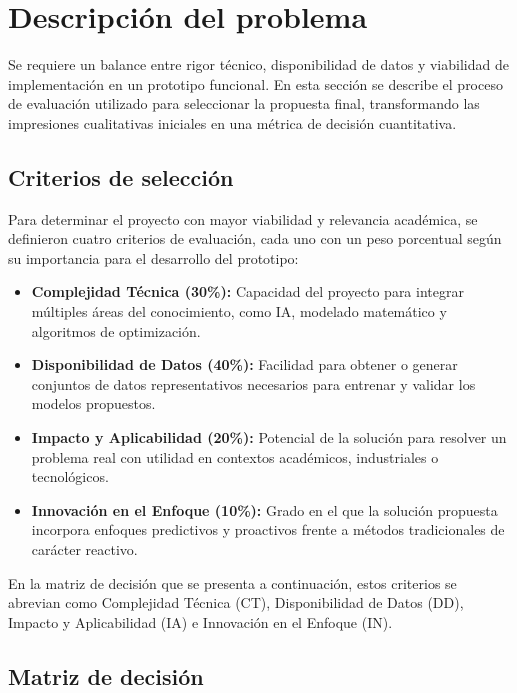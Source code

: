 \section{Descripción del problema}

Se requiere un balance entre rigor técnico, disponibilidad de datos y viabilidad de implementación en un prototipo funcional. En esta sección se describe el proceso de evaluación utilizado para seleccionar la propuesta final, transformando las impresiones cualitativas iniciales en una métrica de decisión cuantitativa.

\subsection{Criterios de selección}

Para determinar el proyecto con mayor viabilidad y relevancia académica, se definieron cuatro criterios de evaluación, cada uno con un peso porcentual según su importancia para el desarrollo del prototipo:

\begin{itemize}
    \item \textbf{Complejidad Técnica (30\%):} Capacidad del proyecto para integrar múltiples áreas del conocimiento, como IA, modelado matemático y algoritmos de optimización.

    \item \textbf{Disponibilidad de Datos (40\%):} Facilidad para obtener o generar conjuntos de datos representativos necesarios para entrenar y validar los modelos propuestos.

    \item \textbf{Impacto y Aplicabilidad (20\%):} Potencial de la solución para resolver un problema real con utilidad en contextos académicos, industriales o tecnológicos.

    \item \textbf{Innovación en el Enfoque (10\%):} Grado en el que la solución propuesta incorpora enfoques predictivos y proactivos frente a métodos tradicionales de carácter reactivo.
\end{itemize}

En la matriz de decisión que se presenta a continuación, estos criterios se abrevian como Complejidad Técnica (CT), Disponibilidad de Datos (DD), Impacto y Aplicabilidad (IA) e Innovación en el Enfoque (IN).

\subsection{Matriz de decisión}

